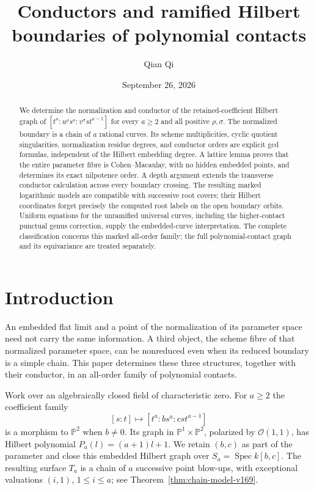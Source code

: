 \documentclass[11pt,reqno]{amsart}
\numberwithin{equation}{section}
\theoremstyle{definition}\newtheorem{definition}[theorem]{Definition}
\theoremstyle{remark}\newtheorem{remark}[theorem]{Remark}
\newcommand{\Pj}{\mathbb P}\newcommand{\A}{\mathbb A}
\newcommand{\OO}{\mathcal O}\newcommand{\II}{\mathcal I}
\DeclareMathOperator{\Spec}{Spec}\DeclareMathOperator{\PGL}{PGL}
\begin{document}
\title{Conductors and ramified Hilbert boundaries of polynomial contacts}
\author{Qian Qi}
\date{September 26, 2026}
\begin{abstract}
We determine the normalization and conductor of the retained-coefficient
Hilbert graph of $[t^a:u^\rho s^a:v^\sigma st^{a-1}]$ for every
$a\geq2$ and all positive $\rho,\sigma$. The normalized boundary
is a chain of $a$ rational curves. Its scheme multiplicities,
cyclic quotient singularities, normalization residue degrees, and
conductor orders are explicit gcd formulas, independent of the
Hilbert embedding degree. A lattice lemma proves that the entire
parameter fibre is Cohen--Macaulay, with no hidden embedded points,
and determines its exact nilpotence order. A depth argument extends
the transverse conductor calculation across every boundary crossing.
The resulting marked logarithmic models are compatible with successive
root covers; their Hilbert coordinates forget precisely the computed
root labels on the open boundary orbits. Uniform equations for the
unramified universal curves, including the higher-contact punctual
genus correction, supply the embedded-curve interpretation. The complete
classification concerns this marked all-order family; the full
polynomial-contact graph and its equivariance are treated separately.
\end{abstract}
\maketitle



\section{Introduction}
\label{sec:paper-ii-v164}\label{sec:paper-ii-v166}\label{sec:paper-ii-v167}
\label{sec:paper-ii-v169}\label{sec:paper-ii-v170}
An embedded flat limit and a point of the normalization of its parameter
space need not carry the same information. A third object, the scheme
fibre of that normalized parameter space, can be nonreduced even when
its reduced boundary is a simple chain. This paper determines these
three structures, together with their conductor, in an all-order
family of polynomial contacts.

Work over an algebraically closed field of characteristic zero. For
$a\geq2$ the coefficient family
\[
 [s:t]\longmapsto[t^a:bs^a:cst^{a-1}]
\]
is a morphism to $\Pj^2$ when $b\ne0$. Its graph in
$\Pj^1\times\Pj^2$, polarized by $\OO(1,1)$, has Hilbert polynomial
$P_a(l)=(a+1)l+1$. We retain $(b,c)$ as part of the parameter and
close this embedded Hilbert graph over $S_a=\Spec k[b,c]$.
The resulting surface $T_a$ is a chain of $a$ successive point
blow-ups, with exceptional valuations $(i,1)$,
$1\leq i\leq a$; see Theorem~\ref{thm:chain-model-v169}.
\end{document}
